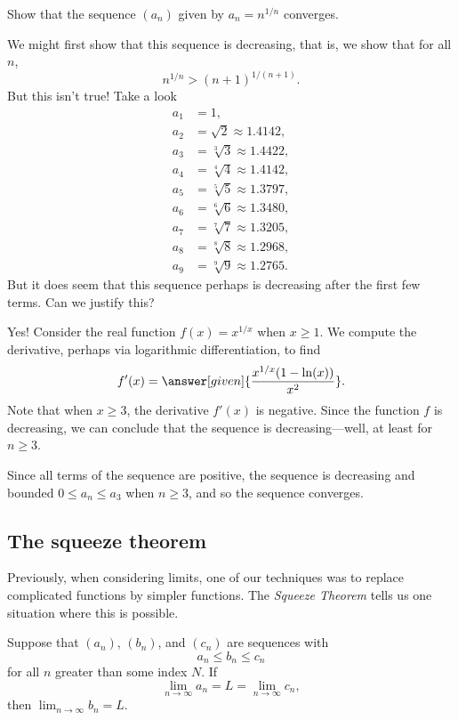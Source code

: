 \documentclass{ximera}
\begin{document}
\begin{example}
Show that the sequence $(a_n)$ given by $a_n = n^{1/n}$ converges.
\begin{explanation}
  We might first show that this sequence is decreasing, that is, we show
  that for all $n$,
  \[
  n^{1/n} > (n+1)^{1/(n+1)}.
  \]
  But this isn't true!  Take a look
  \begin{align*}
    a_1 &= 1, \\
    a_2 &= \sqrt{2} \approx 1.4142, \\
    a_3 &= \sqrt[3]{3} \approx 1.4422, \\
    a_4 &= \sqrt[4]{4} \approx 1.4142, \\
    a_5 &= \sqrt[5]{5} \approx 1.3797, \\
    a_6 &= \sqrt[6]{6} \approx 1.3480, \\
    a_7 &= \sqrt[7]{7} \approx 1.3205, \\
    a_8 &= \sqrt[8]{8} \approx 1.2968, \\
    a_9 &= \sqrt[9]{9} \approx 1.2765.
  \end{align*}
  But it does seem that this sequence perhaps is decreasing after the
  first few terms.  Can we justify this?

  Yes!  Consider the real function $f(x)=x^{1/x}$ when $x\ge 1$.  We
  compute the derivative, perhaps via logarithmic differentiation, to find
  \[
  f'(x)=\answer[given]{\frac{x^{1/x} (1-\ln(x))}{x^2}}.
  \]
  Note that when $x\ge 3$, the derivative $f'(x)$ is negative.  Since
  the function $f$ is decreasing, we can conclude that the sequence is
  decreasing---well, at least for $n \geq 3$.

  Since all terms of the sequence are positive, the sequence is
  decreasing and bounded $0\le a_n \le a_3$ when $n \ge 3$, and so the
  sequence converges.
\end{explanation}
\end{example}



\subsection{The squeeze theorem}

Previously, when considering limits, one of our techniques was to replace 
complicated functions by simpler functions. The \textit{Squeeze Theorem}
tells us one situation where this is possible.

\begin{theorem}
  Suppose that $(a_n)$, $(b_n)$, and $(c_n)$ are sequences with
  \[
  a_n \le b_n \le c_n
  \]
  for all $n$ greater than some index $N$. If
  \[
  \lim_{n\to\infty} a_n = L = \lim_{n\to\infty} c_n,
  \] 
  then $\lim_{n\to\infty} b_n = L$.
\end{theorem}
\end{document}
